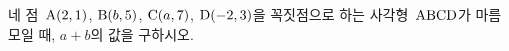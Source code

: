 네 점~$\mathrm{A}(2{,}\mkern3mu\mathopen{}1)$, $\mathrm{B}(b{,}\mkern3mu\mathopen{}5)$, $\mathrm{C}(a{,}\mkern3mu\mathopen{}7)$, $\mathrm{D}(-2{,}\mkern3mu\mathopen{}3)$을 꼭짓점으로 하는 사각형~$\mathrm{ABCD}$가 마름모일 때, $a+b$의 값을 구하시오. 
